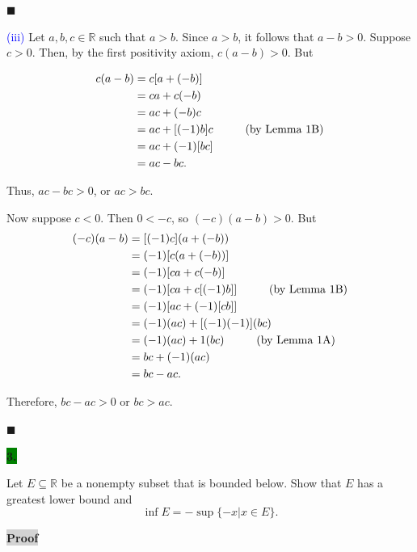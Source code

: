 \documentclass[12pt]{article}
\newcommand{\mybox}{%
    \collectbox{%
        \setlength{\fboxsep}{2pt}%
        \fbox{\BOXCONTENT}%
    }%
}
\begin{document}
\hfill$\blacksquare$

\noindent\textcolor{blue}{(iii)} Let $a,b,c\in\mathbb{R}$ such that $a>b$. Since $a>b$, it follows that $a-b>0.$ Suppose $c>0$. Then, by the first positivity axiom, $c(a-b)>0$. But 

\begin{align*}
c(a-b)&=c[a+(-b)] \\
&= ca + c(-b) \\
&= ac + (-b)c \\
&= ac + [(-1)b]c \hspace{10mm} \text{(by Lemma 1B)} \\
&= ac +(-1)[bc] \\
&=ac - bc.
\end{align*}

\noindent Thus, $ac-bc>0$, or $ac>bc.$ 

\noindent Now suppose $c<0$.  Then $0<-c$, so $(-c)(a-b)>0$. But 
\begin{align*}
(-c)(a-b) &= [(-1)c](a+(-b)) \\
&= (-1)[c(a+(-b))] \\
&= (-1)[ca +c(-b)] \\
&= (-1)[ca + c[(-1)b]] \hspace{10mm} \text{(by Lemma 1B)} \\
&= (-1)[ac +(-1)[cb]] \\
&= (-1)(ac) + [(-1)(-1)](bc) \\
&= (-1)(ac) + 1(bc) \hspace{10mm} \text{(by Lemma 1A)} \\
&= bc + (-1)(ac) \\
&= bc - ac.
\end{align*}

\noindent Therefore, $bc-ac>0$ or $bc>ac$.

\hfill$\blacksquare$

\pagebreak

\noindent\mybox{\colorbox{green}{\textbf{3.}}}\hspace{3mm}\hrulefill

\noindent Let $E\subseteq \mathbb{R}$ be a nonempty subset that is bounded below. Show that $E$ has a greatest lower bound and $$\inf E = -\sup \lbrace -x | x \in E\rbrace.$$

\vspace{5mm}

\noindent\mybox{\colorbox{lightgray}{\textbf{Proof}}} \hspace{3mm}\hrulefill
\end{document}

